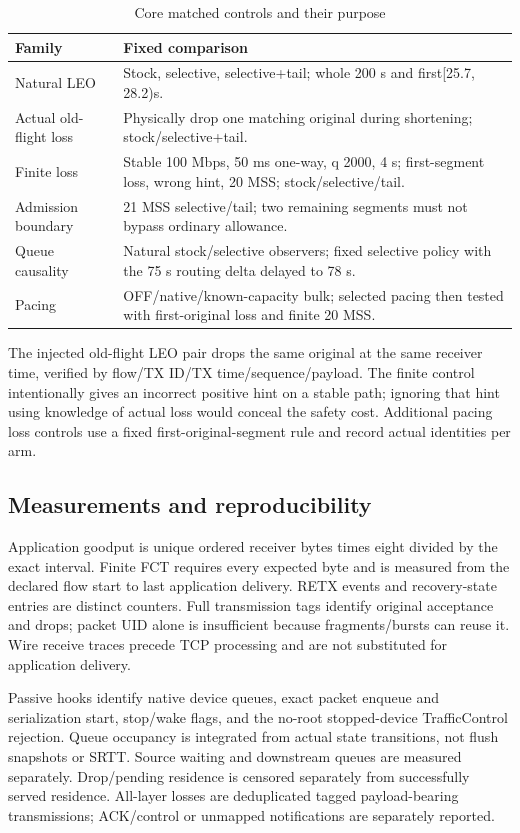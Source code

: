 \documentclass[conference]{IEEEtran}
\begin{document}
\begin{table}[t]
\caption{Core matched controls and their purpose}
\label{tab:setup}
\centering
\begin{tabular}{p{0.93 in}p{2.20 in}}
\toprule
Family & Fixed comparison\\
\midrule
Natural LEO & Stock, selective, selective+tail; whole 200 s and
first[25.7, 28.2)s.\\
Actual old-flight loss & Physically drop one matching original during
shortening; stock/selective+tail.\\
Finite loss & Stable 100 Mbps, 50 ms one-way, q 2000, 4 s; first-segment
loss, wrong hint, 20 MSS; stock/selective/tail.\\
Admission boundary &21 MSS selective/tail; two remaining segments must
not bypass ordinary allowance.\\
Queue causality & Natural stock/selective observers; fixed selective
policy with the 75 s routing delta delayed to 78 s.\\
Pacing & OFF/native/known-capacity bulk; selected pacing then tested
with first-original loss and finite 20 MSS.\\
\bottomrule
\end{tabular}
\end{table}

The injected old-flight LEO pair drops the same original at the same
receiver time, verified by flow/TX ID/TX time/sequence/payload. The
finite control intentionally gives an incorrect positive hint on a
stable path; ignoring that hint using knowledge of actual loss would
conceal the safety cost. Additional pacing loss controls use a fixed
first-original-segment rule and record actual identities per arm.

\subsection{Measurements and reproducibility}
Application goodput is unique ordered receiver bytes times eight divided
by the exact interval. Finite FCT requires every expected byte and is
measured from the declared flow start to last application delivery.
RETX events and recovery-state entries are distinct counters. Full
transmission tags identify original acceptance and drops; packet UID
alone is insufficient because fragments/bursts can reuse it. Wire receive
traces precede TCP processing and are not substituted for application
delivery.

Passive hooks identify native device queues, exact packet enqueue and
serialization start, stop/wake flags, and the no-root stopped-device
TrafficControl rejection. Queue occupancy is integrated from actual
state transitions, not flush snapshots or SRTT. Source waiting and
downstream queues are measured separately. Drop/pending residence is
censored separately from successfully served residence. All-layer losses
are deduplicated tagged payload-bearing transmissions; ACK/control or
unmapped notifications are separately reported.
\end{document}
